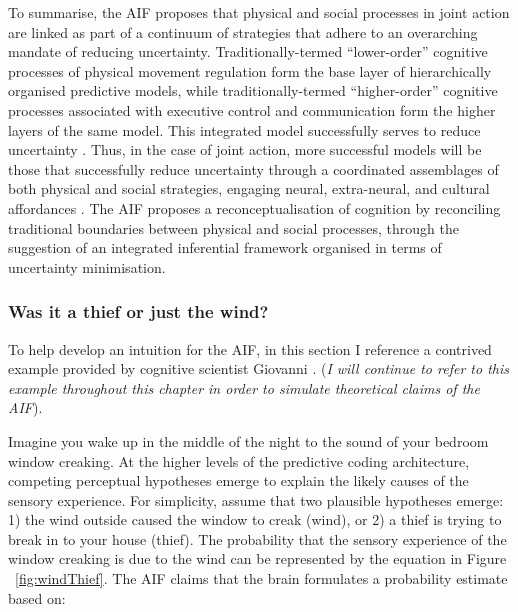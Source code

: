 \begin{CJK}{UTF8}{gbsn}
To summarise, the AIF proposes that physical and social processes in joint action are linked as part of a continuum of strategies that adhere to an overarching mandate of reducing uncertainty.  Traditionally-termed ``lower-order'' cognitive processes of physical movement regulation form the base layer of hierarchically organised predictive models, while traditionally-termed ``higher-order'' cognitive processes associated with executive control and communication form the higher layers of the same model. This integrated model successfully serves to reduce uncertainty \citep[over the lifespan of the organism][]{Ramstead2017}.  Thus, in the case of joint action, more successful models will be those that successfully reduce uncertainty through a coordinated assemblages of both physical and social strategies, engaging neural, extra-neural, and cultural affordances \citep{Clark2015}.  The AIF proposes a reconceptualisation of cognition by reconciling traditional boundaries between physical and social processes, through the suggestion of an integrated inferential framework organised in terms of uncertainty minimisation.






\subsubsection{Was it a thief or just the wind?\label{sect:windThief}}
To help develop an intuition for the AIF, in this section I reference a contrived example provided by cognitive scientist Giovanni \textcite{Pezzulo2014}.  (\textit{I will continue to refer to this example throughout this chapter in order to simulate theoretical claims of the AIF}).

Imagine you wake up in the middle of the night to the sound of your bedroom window creaking.  At the higher levels of the predictive coding architecture, competing perceptual hypotheses emerge to explain the likely causes of the sensory experience.  For simplicity, assume that two plausible hypotheses emerge: 1) the wind outside caused the window to creak (wind), or 2) a thief is trying to break in to your house (thief).  The probability that the sensory experience of the window creaking is due to the wind can be represented by the equation in Figure ~\ref{fig:windThief}. The AIF claims that the brain formulates a probability estimate based on:


\end{CJK}
